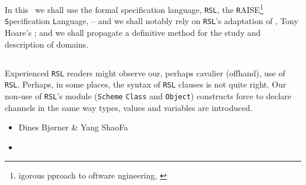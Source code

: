 \treprikker

\noindent
\pind In this \primer\ we shall use
\begynd 
\pind the formal specification language, \texttt{RSL}, 
\pind the \texttt{R}AISE\footnote{igorous
      pproach\ysfchgii{ }
      to  oftware ngineering,
      \cite{RaiseMethod}} \texttt{S}pecification 
      \texttt{L}anguage, \cite{RSL} -- 
\pind and we shall
      notably rely on \texttt{RSL}'s adaptation of , Tony
      Hoare's  \citecsp;
\pind and we shall propagate a definitive method for the study and
      description of domains.
\afslut
\afslut

\subsection*{} 


\subsection*{}

Experienced \texttt{RSL} \cite{RSL} readers might observe our,
perhaps cavalier (offhand), use of  \texttt{RSL}. Perhaps, in some places, the 
syntax of  \texttt{RSL} clauses is not quite right. Our non-use of
\texttt{RSL}'s module (\texttt{Scheme}\ysfchg{, } \texttt{Class} and \texttt{Object})
constructs force  to declare \textsf{channel}s in the same way
\textsf{type}s, \textsf{value}s and \textsf{variable}s are introduced.

\begin{itemize}

\item[] \hfill   Dines Bj{\o}rner \& Yang ShaoFa

\item[] \hfill \todaytime
\end{itemize}


\label{preface.n}
